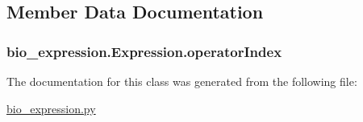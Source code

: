 \subsection{Member Data Documentation}
\hypertarget{classbio__expression_1_1_expression_a52a16cb6e8ba6382b354164c41da65ea}{
\subsubsection[{operator\+Index}]{\setlength{\rightskip}{0pt plus 5cm}bio\+\_\+expression.\+Expression.\+operator\+Index}}\label{classbio__expression_1_1_expression_a52a16cb6e8ba6382b354164c41da65ea}


The documentation for this class was generated from the following file\+:\begin{DoxyCompactItemize}
\item 
\hyperlink{bio__expression_8py}{bio\+\_\+expression.\+py}\end{DoxyCompactItemize}
